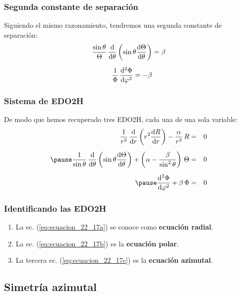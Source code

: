 \documentclass[12pt]{beamer}
\begin{document}
\begin{frame}
\frametitle{Segunda constante de separación}
Siguiendo el mismo razonamiento, tendremos una segunda constante de separación:
\pause
\begin{align*}
\dfrac{\sin \theta}{\Theta} \, \dv{\theta} \left( \sin \theta \dv{\Theta}{\theta} \right) &= \beta \\[0.5em]
\dfrac{1}{\Phi} \, \dv[2]{\Phi}{\varphi} = - \beta
\end{align*}
\end{frame}
\begin{frame}
\frametitle{Sistema de EDO2H}
De modo que hemos recuperado tres EDO2H, cada una de una sola variable:
\pause
\begin{eqnarray}
\dfrac{1}{r^{2}} \, \dv{r} \left( r^{2} \dv{R}{r} \right) - \dfrac{\alpha}{r^{2}} \, R &=& 0 \label{eq:ecuacion_22_17a} \\[0.5em] \pause
\dfrac{1}{\sin \theta} \, \dv{\theta} \left( \sin \theta \dv{\Theta}{\theta} \right) + \left( \alpha - \dfrac{\beta}{\sin^{2} \theta} \right) \, \Theta &=& 0 \label{eq:ecuacion_22_17b} \\[0.5em] \pause
\dv[2]{\Phi}{\varphi} + \beta \, \Phi &=& 0 \label{eq:ecuacion_22_17c}
\end{eqnarray}
\end{frame}
\begin{frame}
\frametitle{Identificando las EDO2H}
\begin{enumerate}[<+->]
\item La ec. (\ref{eq:ecuacion_22_17a}) se conoce como \textbf{ecuación radial}.
\item La ec. (\ref{eq:ecuacion_22_17b}) es la \textbf{ecuación polar}.
\item La tercera ec. (\ref{eq:ecuacion_22_17c}) es la \textbf{ecuación azimutal}.
\end{enumerate}
\end{frame}

\subsection{Simetría azimutal}
\end{document}
